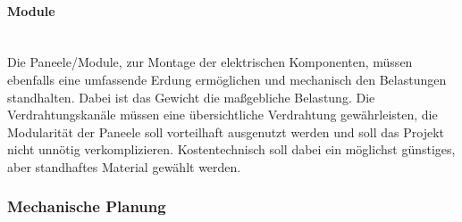     \paragraph{Module}\mbox{}\\
    Die Paneele/Module, zur Montage der elektrischen Komponenten, müssen ebenfalls eine umfassende Erdung ermöglichen und mechanisch den Belastungen standhalten. Dabei ist das Gewicht die maßgebliche Belastung. Die Verdrahtungskanäle müssen eine übersichtliche Verdrahtung gewährleisten, die Modularität der Paneele soll vorteilhaft ausgenutzt werden und soll das Projekt nicht unnötig verkomplizieren. Kostentechnisch soll dabei ein möglichst günstiges, aber standhaftes Material gewählt werden.

\subsubsection{Mechanische Planung}

